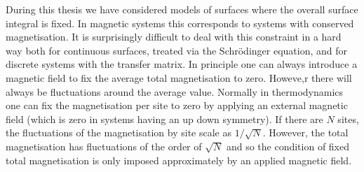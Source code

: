 During this thesis we have considered models of surfaces where the overall surface integral is fixed. In magnetic systems this corresponds to systems with conserved magnetisation. It is surprisingly difficult to deal with this constraint in a hard way both for continuous surfaces, treated via the Schr\"odinger equation, and for discrete systems with the transfer matrix. In principle one can always introduce a magnetic field to fix the average total magnetisation to zero. Howeve,r there will always be fluctuations around the average value. Normally in thermodynamics one can fix the magnetisation per site to zero by applying an external magnetic field (which is zero in systems having an up down symmetry). If there are $N$ sites, the fluctuations of the magnetisation by site scale as $1/\sqrt{N}$.  However, the total magnetisation has fluctuations of the order of $\sqrt{N}$ and so the condition of fixed  total magnetisation is only imposed approximately by an applied magnetic field.

